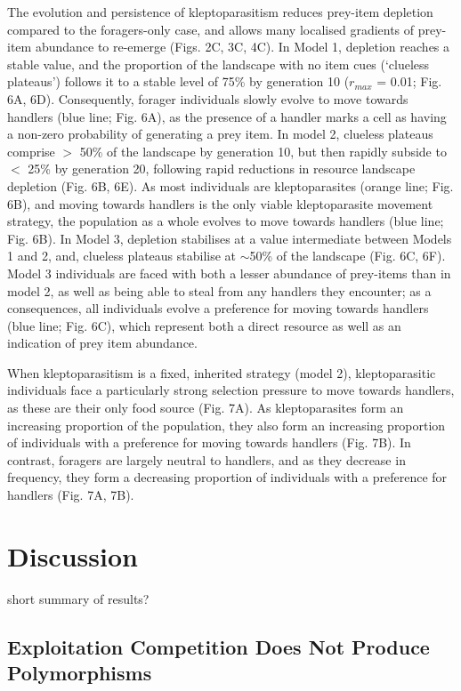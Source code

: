 \documentclass[11pt]{article}
\begin{document}
The evolution and persistence of kleptoparasitism reduces prey-item depletion compared to the foragers-only case, and allows many localised gradients of prey-item abundance to re-emerge (Figs. 2C, 3C, 4C).
In Model 1, depletion reaches a stable value, and the proportion of the landscape with no item cues (`clueless plateaus') follows it to a stable level of 75\% by generation 10 ($r_{max}$ = 0.01; Fig. 6A, 6D).
Consequently, forager individuals slowly evolve to move towards handlers (blue line; Fig. 6A), as the presence of a handler marks a cell as having a non-zero probability of generating a prey item.
%
In model 2, clueless plateaus comprise $>$ 50\% of the landscape by generation 10, but then rapidly subside to $<$ 25\% by generation 20, following rapid reductions in resource landscape depletion (Fig. 6B, 6E).
As most individuals are kleptoparasites (orange line; Fig. 6B), and moving towards handlers is the only viable kleptoparasite movement strategy, the population as a whole evolves to move towards handlers (blue line; Fig. 6B).
In Model 3, depletion stabilises at a value intermediate between Models 1 and 2, and, clueless plateaus stabilise at $\sim$50\% of the landscape (Fig. 6C, 6F).
Model 3 individuals are faced with both a lesser abundance of prey-items than in model 2, as well as being able to steal from any handlers they encounter; as a consequences, all individuals evolve a preference for moving towards handlers (blue line; Fig. 6C), which represent both a direct resource as well as an indication of prey item abundance.

When kleptoparasitism is a fixed, inherited strategy (model 2), kleptoparasitic individuals face a particularly strong selection pressure to move towards handlers, as these are their only food source (Fig. 7A).
As kleptoparasites form an increasing proportion of the population, they also form an increasing proportion of individuals with a preference for moving towards handlers (Fig. 7B).
In contrast, foragers are largely neutral to handlers, and as they decrease in frequency, they form a decreasing proportion of individuals with a preference for handlers (Fig. 7A, 7B).

\section{Discussion}

short summary of results?

\subsection{Exploitation Competition Does Not Produce Polymorphisms}
\end{document}
